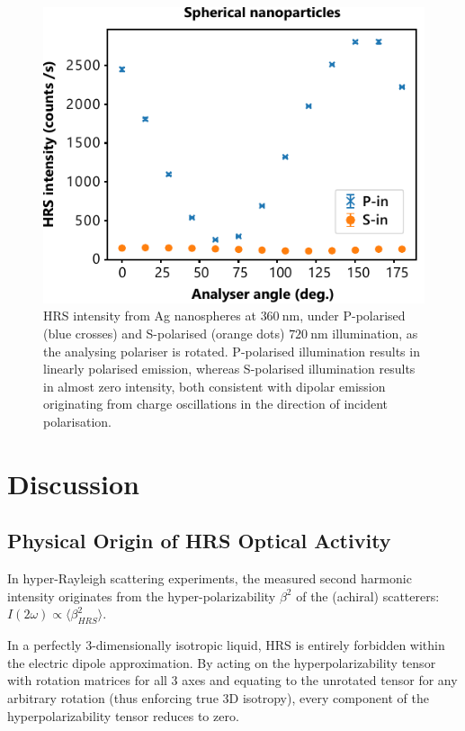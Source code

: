 \begin{figure}[htb!]	
    \centering	
    \includegraphics[scale=1.0]{./figures/results/HRS/hrs_spheres.pdf}
    \caption{\label{fig:results:HRS:hrs_spheres}
    HRS intensity from Ag nanospheres at $\SI{360}{\nano\m}$, under P-polarised (blue crosses) and S-polarised (orange dots) $\SI{720}{\nano\m}$ illumination, as the analysing polariser is rotated. P-polarised illumination results in linearly polarised emission, whereas S-polarised illumination results in almost zero intensity, both consistent with dipolar emission originating from charge oscillations in the direction of incident polarisation.}	
\end{figure}

\section{Discussion}

\subsection{Physical Origin of HRS Optical Activity}
In hyper-Rayleigh scattering experiments, the measured second harmonic intensity originates from the hyper-polarizability $\beta^{2}$ of the (achiral) scatterers: $I(2\omega) \propto \langle \beta^{2}_{HRS} \rangle$.

In a perfectly 3-dimensionally isotropic liquid, HRS is entirely forbidden within the electric dipole approximation. By acting on the hyperpolarizability tensor with rotation matrices for all 3 axes and equating to the unrotated tensor for any arbitrary rotation (thus enforcing true 3D isotropy), every component of the hyperpolarizability tensor reduces to zero.

